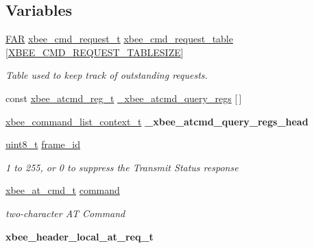 \subsection*{Variables}
\begin{DoxyCompactItemize}
\item 
\hypertarget{group__xbee__atcmd_ga551531248de3d539dfb15bd89cf4734b}{\hyperlink{group__hal_gaef060b3456fdcc093a7210a762d5f2ed}{F\-A\-R} \hyperlink{structxbee__cmd__request__t}{xbee\-\_\-cmd\-\_\-request\-\_\-t} \hyperlink{group__xbee__atcmd_ga551531248de3d539dfb15bd89cf4734b}{xbee\-\_\-cmd\-\_\-request\-\_\-table} \mbox{[}\hyperlink{group__xbee__atcmd_gaf992e9b985e2b1eb185ef3d2d38a01c0}{X\-B\-E\-E\-\_\-\-C\-M\-D\-\_\-\-R\-E\-Q\-U\-E\-S\-T\-\_\-\-T\-A\-B\-L\-E\-S\-I\-Z\-E}\mbox{]}}\label{group__xbee__atcmd_ga551531248de3d539dfb15bd89cf4734b}

\begin{DoxyCompactList}\small\item\em Table used to keep track of outstanding requests. \end{DoxyCompactList}\item 
const \hyperlink{structxbee__atcmd__reg__t}{xbee\-\_\-atcmd\-\_\-reg\-\_\-t} \hyperlink{group__xbee__atcmd_ga0b78107b2303165b7cf9969125064dcc}{\-\_\-xbee\-\_\-atcmd\-\_\-query\-\_\-regs} \mbox{[}$\,$\mbox{]}
\item 
\hypertarget{group__xbee__atcmd_ga6cd73a1bba0cb3c1766f7f7d5d2123ea}{\hyperlink{structxbee__command__list__context__t}{xbee\-\_\-command\-\_\-list\-\_\-context\-\_\-t} {\bfseries \-\_\-xbee\-\_\-atcmd\-\_\-query\-\_\-regs\-\_\-head}}\label{group__xbee__atcmd_ga6cd73a1bba0cb3c1766f7f7d5d2123ea}

\item 
\hyperlink{group__hal_gae1affc9ca37cfb624959c866a73f83c2}{uint8\-\_\-t} \hyperlink{group__xbee__atcmd_ga03c1016ac46b9df250b994f242cf956a}{frame\-\_\-id}
\begin{DoxyCompactList}\small\item\em 1 to 255, or 0 to suppress the Transmit Status response \end{DoxyCompactList}\item 
\hyperlink{unionxbee__at__cmd__t}{xbee\-\_\-at\-\_\-cmd\-\_\-t} \hyperlink{group__xbee__atcmd_ga1a5aaa930940857f68f245eeb89506b5}{command}
\begin{DoxyCompactList}\small\item\em two-\/character A\-T Command \end{DoxyCompactList}\item 
\hypertarget{group__xbee__atcmd_ga568e56506b6d03a08723e768edbbcfa7}{{\bfseries xbee\-\_\-header\-\_\-local\-\_\-at\-\_\-req\-\_\-t}}\label{group__xbee__atcmd_ga568e56506b6d03a08723e768edbbcfa7}


\end{DoxyCompactItemize}

